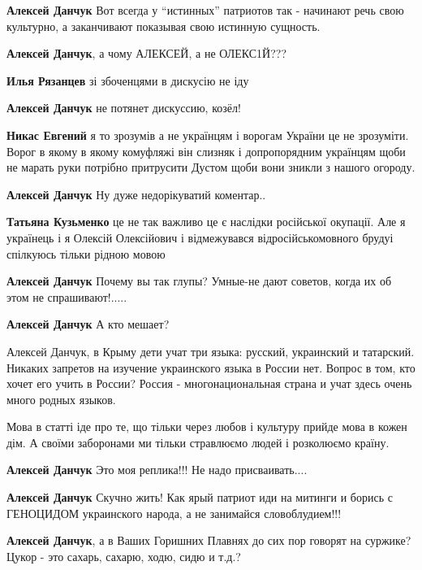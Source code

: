 \begin{itemize}
{\begin{itemize}
\textbf{Алексей Данчук} Вот всегда у \enquote{истинных} патриотов так - начинают речь
свою культурно, а заканчивают показывая свою истинную сущность.

\textbf{Алексей Данчук}, а чому АЛЕКСЕЙ, а не ОЛЕКС1Й???

\textbf{Илья Рязанцев} зі збоченцями в дискусію не іду

\textbf{Алексей Данчук} не потянет дискуссию, козёл!


\textbf{Никас Евгений} я то зрозумів а не українцям і ворогам України це не зрозуміти.
Ворог в якому в якому комуфляжі він слизняк і допропорядним українцям щоби не
марать руки потрібно притрусити Дустом щоби вони зникли з нашого огороду.

\textbf{Алексей Данчук} Ну дуже недорікуватий коментар..

\textbf{Татьяна Кузьменко} це не так важливо це є наслідки російської окупації.
Але я українець і я Олексій Олексійович і відмежувався відросійськомовного
брудуі спілкуюсь тільки рідною мовою

\textbf{Алексей Данчук} Почему вы так глупы? Умные-не дают советов, когда их об этом не спрашивают!.....

\textbf{Алексей Данчук} А кто мешает?


Алексей Данчук, в Крыму дети учат три языка: русский, украинский и татарский.
Никаких запретов на изучение украинского языка в России нет. Вопрос в том, кто
хочет его учить в России? Россия - многонациональная страна и учат здесь очень
много родных языков.

Мова в статті іде про те, що тільки через любов і культуру прийде мова в кожен
дім. А своїми заборонами ми тільки стравлюємо людей і розколюємо країну.

\textbf{Алексей Данчук} Это моя реплика!!! Не надо присваивать....

\textbf{Алексей Данчук} Скучно жить! Как ярый патриот иди на митинги и борись с
ГЕНОЦИДОМ украинского народа, а не занимайся словоблудием!!!

\textbf{Алексей Данчук}, а в Ваших Горишних Плавнях до сих пор говорят на
суржике? Цукор - это сахарь, сахарю, ходю, сидю и т.д.?



\end{itemize}}
\end{itemize}
